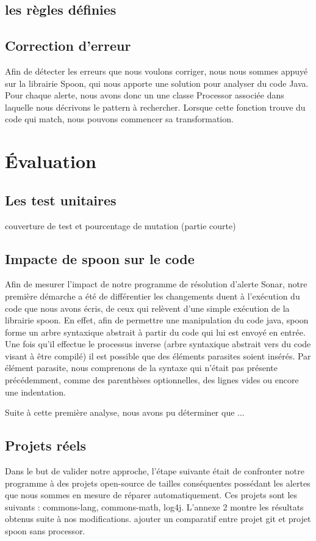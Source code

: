 \documentclass[a4paper]{article}
\begin{document}
\subsection{les règles définies}

\subsection{Correction d'erreur}
\par Afin de détecter les erreurs que nous voulons corriger, nous nous sommes appuyé sur la librairie Spoon, qui nous apporte une solution pour analyser du code Java. Pour chaque alerte, nous avons donc un une classe Processor associée dans laquelle nous décrivons le pattern à rechercher. Lorsque cette fonction trouve du code qui match, nous pouvons commencer sa transformation.

\section{Évaluation}
\subsection{Les test unitaires}
couverture de test et pourcentage de mutation (partie courte)
\subsection{Impacte de spoon sur le code}
\par Afin de mesurer l'impact de notre programme de résolution d'alerte Sonar, notre première démarche a été de différentier les changements duent à l'exécution du code que nous avons écris, de ceux qui relèvent d'une simple exécution de la librairie spoon. En effet, afin de permettre une manipulation du code java, spoon forme un arbre syntaxique abstrait à partir du code qui lui est envoyé en entrée. Une fois qu'il effectue le processus inverse (arbre syntaxique abstrait vers du code visant à être compilé) il est possible que des éléments parasites soient insérés. Par élément parasite, nous comprenons de la syntaxe qui n'était pas présente précédemment, comme des parenthèses optionnelles, des lignes vides ou encore une indentation.
\\
\par Suite à cette première analyse, nous avons pu déterminer que ...
\subsection{Projets réels}
\par Dans le but de valider notre approche, l'étape suivante était de confronter notre programme à des projets open-source de tailles conséquentes possédant les alertes que nous sommes en mesure de réparer automatiquement. Ces projets sont les suivants : commons-lang, commons-math, log4j. L'annexe 2 montre les résultats obtenus suite à nos modifications. 
ajouter un comparatif entre projet git et projet spoon sans processor.
\end{document}
